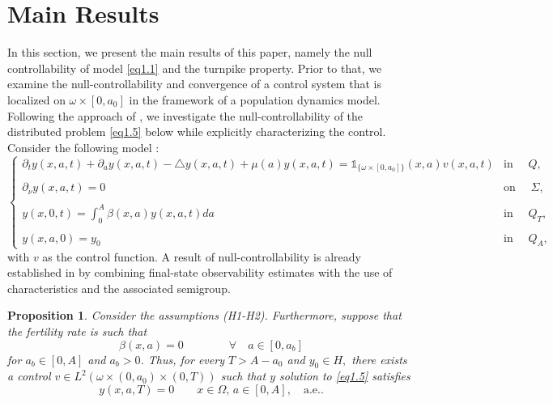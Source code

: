 \documentclass[10pt, a4]{amsart}
\newcounter{assu}
\theoremstyle{plain}
\newtheorem{proposition}[lemma]{Proposition}
\theoremstyle{definition}
\theoremstyle{remark}
\numberwithin{equation}{section}
\begin{document}
\section{Main Results}
 In this section, we present the main results of this paper, namely the null controllability of model \eqref{eq1.1} and the turnpike property. Prior to that, we examine the null-controllability and convergence of a control system that is localized on \(\omega \times [0,a_0]\) in the framework of a population dynamics model. Following the approach of \cite{ref18}, we investigate the null-controllability of the distributed problem \eqref{eq1.5} below while explicitly characterizing the control. Consider the following model :
\begin{equation}\label{eq1.5}
\left\lbrace 
\begin{array}{ll}
\partial_{t}y(x,a,t)+\partial_{a}y(x,a,t)-\triangle y(x,a,t)+\mu(a) y(x,a,t)=\mathds{1}_{\lbrace\omega\times[0,a_0]\rbrace}(x,a)v(x,a,t) &\text{in }\quad Q,\\
 \\\partial_{\nu}y(x,a,t)=0 &\text{on }\quad \Sigma,\\
 \\y(x,0,t)=\displaystyle\int_{0}^{A}\beta(x,a)y(x,a,t)da &\text{in }\quad Q_{T},\\
 \\y(x,a,0)=y_{0} &\text{in }\quad Q_{A},
\end{array}
\right.
\end{equation} 
with \(v\) as the control function. A result of null-controllability is already established in \cite{ref3}  by combining final-state observability estimates with the use of characteristics and the associated semigroup.%
\begin{proposition}\label{th1.3}
Consider the assumptions (H1-H2). Furthermore, suppose that the fertility rate is such that
\begin{equation*}
\beta(x,a)=0\qquad\qquad \forall\quad a\in [0, a_b]
\end{equation*}
for $a_b \in [0, A]$ and $a_b>0$. Thus, for every $T>A-a_0$ and  $y_0\in H,$ there exists a control $v\in L^2(\omega\times(0,a_0)\times(0,T) )$ such that $y$ solution to \eqref{eq1.5} satisfies
\begin{equation}\label{e3.2}
y(x,a,T)=0\qquad x\in\Omega,\,a\in [0,A],\quad\text{a.e.}.
\end{equation}
\end{proposition}
\end{document}
